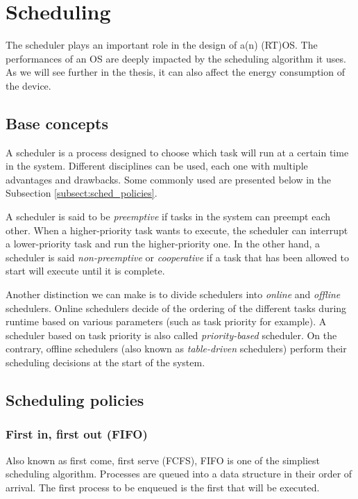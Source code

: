 \section{Scheduling}

The scheduler plays an important role in the design of a(n) (RT)OS.
The performances of an OS are deeply impacted by the scheduling algorithm it uses.
As we will see further in the thesis, it can also affect the energy consumption of the device.\\

\subsection{Base concepts}

A scheduler is a process designed to choose which task will run at a certain time in the system.
Different disciplines can be used, each one with multiple advantages and drawbacks.
Some commonly used are presented below in the Subsection \ref{subsect:sched_policies}.

A scheduler is said to be \textit{preemptive} if tasks in the system can preempt each other.
When a higher-priority task wants to execute, the scheduler can interrupt a lower-priority task and run the higher-priority one.
In the other hand, a scheduler is said \textit{non-preemptive} or \textit{cooperative}
    if a task that has been allowed to start will execute until it is complete.

Another distinction we can make is to divide schedulers into \textit{online} and \textit{offline} schedulers.
Online schedulers decide of the ordering of the different tasks during runtime based on various parameters (such as task priority for example).
A scheduler based on task priority is also called \textit{priority-based} scheduler.
On the contrary, offline schedulers (also known as \textit{table-driven} schedulers) perform their scheduling decisions at the start of the system.

\subsection{Scheduling policies\label{subsect:sched_policies}}

\subsubsection{First in, first out (FIFO)}
Also known as first come, first serve (FCFS), FIFO is one of the simpliest scheduling algorithm.
Processes are queued into a data structure in their order of arrival.
The first process to be enqueued is the first that will be executed.

